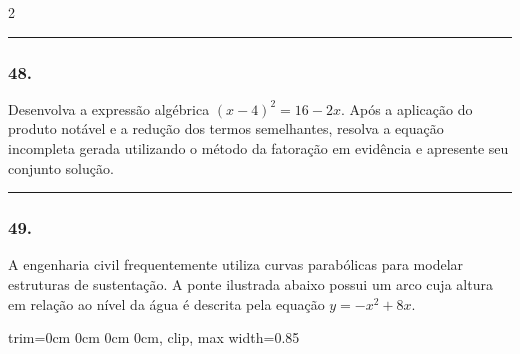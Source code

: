 \documentclass[twoside, 10pt, a4paper]{article}
\newlength{\espacoPreQuestao}\setlength{\espacoPreQuestao}{0.1cm}
\newlength{\espacoQuestao}\setlength{\espacoQuestao}{0.2cm}
\newcommand{\larguraTikz}{0.85\linewidth}
\begin{document}
\begin{multicols*}{2}
\noindent\textcolor{CorLinha}{\rule{\linewidth}{0.5pt}} 
\par\vspace{\espacoPreQuestao}
\subsubsection*{48.} Desenvolva a expressão algébrica $ (x - 4)^2 = 16 - 2x $. Após a aplicação do produto notável e a redução dos termos semelhantes, resolva a equação incompleta gerada utilizando o método da fatoração em evidência e apresente seu conjunto solução.
\par\vspace{\espacoQuestao}

\noindent\textcolor{CorLinha}{\rule{\linewidth}{0.5pt}} 
\par\vspace{\espacoPreQuestao}
\subsubsection*{49.} A engenharia civil frequentemente utiliza curvas parabólicas para modelar estruturas de sustentação. A ponte ilustrada abaixo possui um arco cuja altura em relação ao nível da água é descrita pela equação $ y = -x^2 + 8x $.

\begin{center}
\begin{adjustbox}{trim=0cm 0cm 0cm 0cm, clip, max width=\larguraTikz}
\end{adjustbox}
\end{center}


\end{multicols*}
\end{document}
